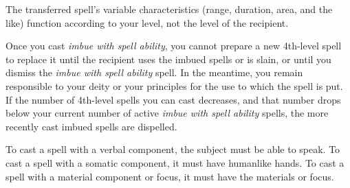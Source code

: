 The transferred spell's variable characteristics (range, duration, area, and the 
like) function according to your level, not the level of the recipient.

Once you cast \textit{imbue with spell ability}, you cannot prepare a new 4th-level 
spell to replace it until the recipient uses the imbued spells or is slain, or 
until you dismiss the \textit{imbue with spell ability} spell. In the meantime, 
you remain responsible to your deity or your principles for the use to which the 
spell is put. If the number of 4th-level spells you can cast decreases, and that 
number drops below your current number of active \textit{imbue with spell ability 
}spells, the more recently cast imbued spells are dispelled.

To cast a spell with a verbal component, the subject must be able to speak. To 
cast a spell with a somatic component, it must have humanlike hands. To cast a 
spell with a material component or focus, it must have the materials or focus.

